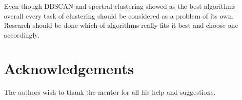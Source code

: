 \documentclass[conference]{IEEEtran}
\begin{document}
Even though DBSCAN and spectral clustering showed as the best algorithms overall every task of
clustering should be considered as a problem of its own. Research should be done which of algorithms
really fits it best and choose one accordingly.

\section*{Acknowledgements}
The authors wish to thank the mentor for all his help and suggestions.









\end{document}
